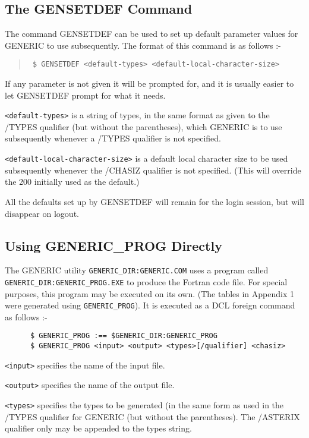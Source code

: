 \subsection{The GENSETDEF Command}

The command GENSETDEF can be used to set up default parameter values
for GENERIC to use subsequently.
The format of this command is as follows :-

\begin{quote}{\tt
\$ GENSETDEF  <default-types>  <default-local-character-size>
}
\end{quote}

If any parameter is not given it will be prompted for,
and it is usually easier to let GENSETDEF prompt for what it needs.

\verb+<default-types>+ is a string of types, in the same format as given to the
/TYPES qualifier (but without the parentheses), which GENERIC is to use
subsequently whenever a /TYPES qualifier is not specified. 

\verb+<default-local-character-size>+ is a default local character size
to be used subsequently whenever the /CHASIZ qualifier is not
specified.
(This will override the 200 initially used as the default.)

All the defaults set up by GENSETDEF will remain for the login
session, but will disappear on logout.

\subsection{Using GENERIC\_PROG Directly}

The GENERIC utility {\tt GENERIC\_DIR:GENERIC.COM} uses a program called \\
{\tt GENERIC\_DIR:GENERIC\_PROG.EXE} to produce the Fortran code file.
For special purposes, this program may be executed on its own.
(The tables in Appendix 1 were generated using {\tt GENERIC\_PROG}).
It is executed as a DCL foreign command as follows :-

\begin{verbatim}
      $ GENERIC_PROG :== $GENERIC_DIR:GENERIC_PROG
      $ GENERIC_PROG <input> <output> <types>[/qualifier] <chasiz>
\end{verbatim}

\verb+<input>+ specifies the name of the input file.
	
\verb+<output>+ specifies the name of the output file.

\verb+<types>+ specifies the types to be generated (in the same form
as used in the /TYPES qualifier for GENERIC (but without the 
parentheses).
The /ASTERIX qualifier only may be appended to the types string.


